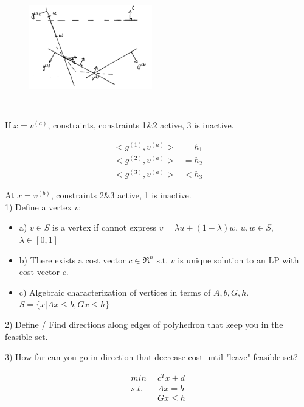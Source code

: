\begin{figure}
	\centering
	\includegraphics[width=2.1in,height=2.1in]{figures/ch07/figure1016_1.png}
\end{figure}


If $x =v^{(a)}$, constraints, constraints 1\&2 active, 3 is inactive.

\begin{align*}
<g^{(1)}, v^{(a)}> &= h_1\\
<g^{(2)}, v^{(a)}> &= h_2\\
<g^{(3)}, v^{(a)}> &< h_3
\end{align*}

At $x = v^{(b)}$, constraints 2\&3 active, 1 is inactive.\\

1) Define a vertex $v$:

\begin{itemize}
	\item a) $v\in S$ is a vertex if cannot express $v = \lambda u +(1-\lambda)w$, $u, w\in S$, $\lambda \in [0,1]$
	
	\item b) There exists a cost vector $c\in \Re^n$ s.t. $v$ is unique solution to an LP with cost vector $c$.
	
	\item c) Algebraic characterization of vertices in terms of $A, b, G, h$. $S = \{x|Ax \leq b, Gx\leq h \}$
\end{itemize}



2) Define / Find directions along edges of polyhedron that keep you in the feasible set.

3) How far can you go in direction that decrease cost until "leave" feasible set?

\begin{align*}
min \,\,\, &c^Tx+d\\
s.t. \,\,\, &Ax = b\\
&Gx\leq h
\end{align*}

